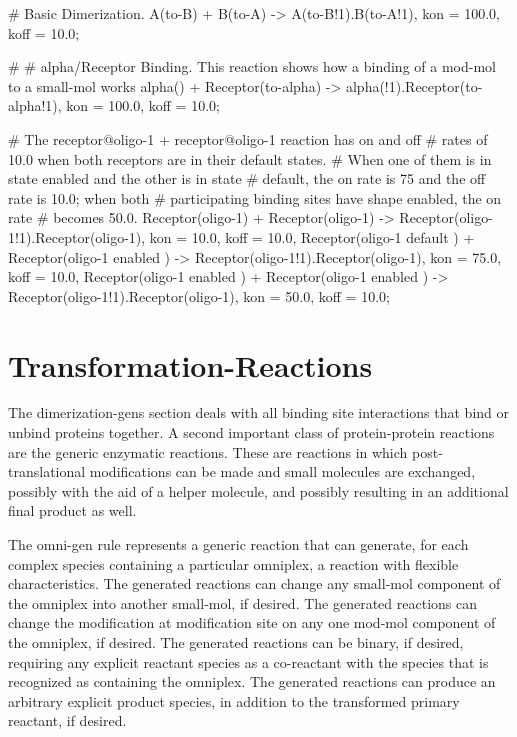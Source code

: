 \begin{ExampleMZR}

  # Basic Dimerization.
  A(to-B) + B(to-A) -> A(to-B!1).B(to-A!1),
       kon = 100.0,
       koff = 10.0;

    #
    # alpha/Receptor Binding.  This reaction shows how a binding of a
    mod-mol to a small-mol works
    alpha() + Receptor(to-alpha) -> alpha(!1).Receptor(to-alpha!1),
    	   kon = 100.0,
	   koff = 10.0;

    # The receptor@oligo-1 + receptor@oligo-1 reaction has on and off
    # rates of 10.0 when both receptors are in their default states.
    # When one of them is in state {enabled} and the other is in state
    # {default}, the on rate is 75 and the off rate is 10.0; when both
    # participating binding sites have shape {enabled}, the on rate
    # becomes 50.0.
    Receptor(oligo-1) + Receptor(oligo-1) -> Receptor(oligo-1!1).Receptor(oligo-1),
          kon = 10.0,
	  koff = 10.0,
       Receptor(oligo-1 { default} ) + Receptor(oligo-1 {enabled } )
         -> 
           Receptor(oligo-1!1).Receptor(oligo-1),
             kon = 75.0,
	     koff = 10.0,
       Receptor(oligo-1 { enabled } ) + Receptor(oligo-1 { enabled} ) 
         -> 
           Receptor(oligo-1!1).Receptor(oligo-1),
             kon = 50.0,
	     koff = 10.0;

\end{ExampleMZR}


 \section{Transformation-Reactions}
 The dimerization-gens section deals with all binding site interactions that bind
 or unbind proteins together.  A second important class of
 protein-protein reactions are the generic enzymatic reactions.  These
 are reactions in
 which post-translational modifications can be made and small molecules are
 exchanged, possibly with the aid of a helper molecule, and possibly
 resulting in an additional final product as well.

 The omni-gen rule represents a generic reaction that can generate,
 for each complex species containing a particular omniplex, a reaction
 with flexible characteristics. The generated reactions can change any
 small-mol component of the omniplex into another small-mol, if
 desired. The generated reactions can change the modification at
 modification site on any one mod-mol component of the omniplex, if
 desired. The generated reactions can be binary, if desired, requiring
 any explicit reactant species as a co-reactant with the species that
 is recognized as containing the omniplex. The generated reactions can
 produce an arbitrary explicit product species, in addition to the
 transformed primary reactant, if desired. 
 
